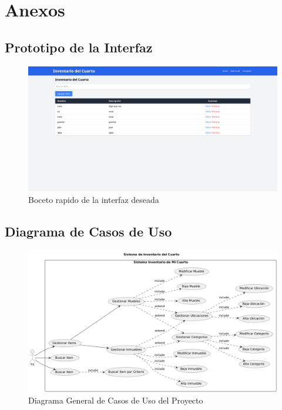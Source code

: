 \documentclass{article}
\begin{document}
\section{Anexos}
\subsection{Prototipo de la Interfaz}
\begin{figure}[H]
    \center
    \includegraphics[width=\textwidth]{img/image1.png}
    \caption{Boceto rapido de la interfaz deseada}
\end{figure}

\subsection{Diagrama de Casos de Uso}
\begin{figure}[H]
    \center
    \includegraphics[width=\textwidth]{img/image.png}
    \caption{Diagrama General de Casos de Uso del Proyecto}
\end{figure}
\end{document}

